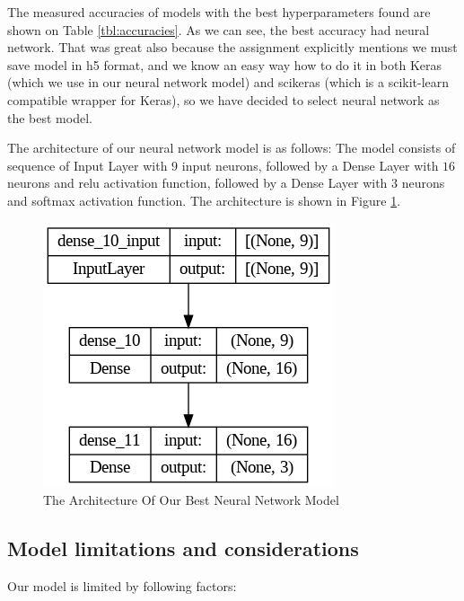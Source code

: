 \documentclass[12pt,a4paper]{article}
\begin{document}
The measured accuracies of models with the best hyperparameters found
are shown on Table \ref{tbl:accuracies}.
As we can see, the best accuracy had neural network. That was great also because the assignment explicitly mentions we must save model in h5 format, and we know an easy way how to do it in both Keras (which we use in our neural network model) and scikeras (which is a scikit-learn compatible wrapper for Keras), so we have decided to select neural network as the best model.

The architecture of our neural network model is as follows: The model consists of sequence of Input Layer with $9$ input neurons, followed by a Dense Layer with $16$ neurons and relu activation function, followed by a Dense Layer with $3$ neurons and softmax activation function. The architecture is shown in Figure \ref{fig:neuralnetworkarchitecture}.

\begin{figure}[h]
	\centering
	\includegraphics[width=0.5\linewidth]{fig_neural_network_model}
	\caption{The Architecture Of Our Best Neural Network Model}
	\label{fig:neuralnetworkarchitecture}
\end{figure}


\subsection{Model limitations and considerations}

Our model is limited by following factors:
\end{document}
